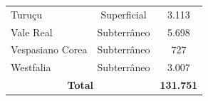 \begin{apendicesenv}
\begin{table}[!htb]
\begin{tabular}{lcc}
Turuçu                  & Superficial        & 3.113                         \\
Vale Real               & Subterrâneo        & 5.698                         \\
Vespasiano Corea        & Subterrâneo        & 727                           \\
Westfalia               & Subterrâneo        & 3.007                         \\\hline
\multicolumn{2}{c}{\textbf{Total}}           & \textbf{131.751}              \\ \bottomrule
    \end{tabular}
    
    \label{tab01}
\end{table}




\end{apendicesenv}


%



\printindex


